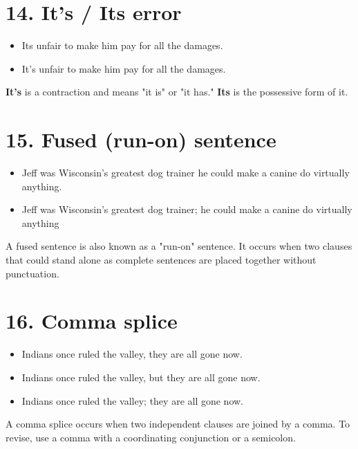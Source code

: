 \section{14. It's / Its error} 


\begin{itemize}
\item Its unfair to make him pay for all the damages. 

\item It's unfair to make him pay for all the damages. 
\end{itemize}

\noindent\textbf{It's} is a contraction and means "it is" or "it has." \textbf{Its} is the
possessive form of it.

\section{15. Fused (run-on) sentence} 

\begin{itemize}
\item Jeff was Wisconsin's greatest dog trainer he could make a canine do virtually anything. 

\item Jeff was Wisconsin's greatest dog trainer; he could make a canine do virtually anything 
\end{itemize}

\noindent A fused sentence is also known as a "run-on" sentence. It occurs when two
clauses that could stand alone as complete sentences are placed together
without punctuation.


\section{16. Comma splice} 

\begin{itemize}
\item Indians once ruled the valley, they are all gone now. 

\item Indians once ruled the valley, but they are all gone now. 

\item Indians once ruled the valley; they are all gone now. 
\end{itemize}

\noindent A comma splice occurs when two independent clauses are joined by a comma. To
revise, use a comma with a coordinating conjunction or a semicolon.



